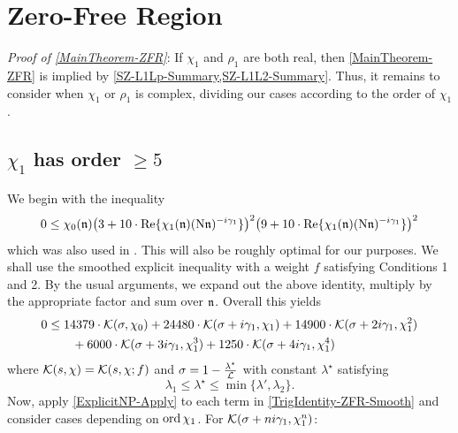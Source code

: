 \documentclass[12pt,psamsfonts]{amsart}
\DeclareRobustCommand{\SkipTocEntry}[5]{}
\theoremstyle{definition}
\theoremstyle{remark}
\numberwithin{equation}{section}
\begin{document}
\section{Zero-Free Region}
\label{sec:ZeroFreeRegion}
\noindent
\emph{Proof of \cref{MainTheorem-ZFR}}:   If $\chi_1$ and $\rho_1$ are both real, then \cref{MainTheorem-ZFR} is implied by \cref{SZ-L1Lp-Summary,SZ-L1L2-Summary}. 
Thus, it remains to consider when $\chi_1$ or $\rho_1$ is complex, dividing our cases according to the order of $\chi_1$.
\noindent
{}
\subsection*{$\chi_1$ has order $\geq 5$}
We begin with the inequality 
\begin{equation}
0  \leq \chi_0(\mathfrak{n}) \big(3+10 \cdot\mathrm{Re}\{ \chi_1(\mathfrak{n}) (\mathrm{N}\mathfrak{n})^{-i\gamma_1}\} \big)^2 \big( 9 + 10 \cdot \mathrm{Re}\{\chi_1(\mathfrak{n}) (\mathrm{N}\mathfrak{n})^{-i\gamma_1} \} \big)^2
\label{ZFR-TrigIdentity-NonPrincipal}
\end{equation}
which was also used in \cite[Section 9]{HBLinnik}. This will also be roughly optimal for our purposes. We shall use the smoothed explicit inequality with a weight $f$ satisfying Conditions 1 and 2. By the usual arguments, we expand out the above identity, multiply by the appropriate factor and sum over $\mathfrak{n}$. Overall this yields
\begin{equation}
\begin{aligned}
0 & \leq 14379 \cdot \mathcal{K}(\sigma, \chi_0)  +  24480  \cdot \mathcal{K}(\sigma+i\gamma_1, \chi_1) +  14900 \cdot \mathcal{K}(\sigma+2i\gamma_1, \chi_1^2) \\
& \qquad +  6000 \cdot \mathcal{K}(\sigma + 3i\gamma_1, \chi_1^3) + 1250 \cdot \mathcal{K}(\sigma + 4i\gamma_1, \chi_1^4) \\
\end{aligned} 
\label{TrigIdentity-ZFR-Smooth}
\end{equation}
where $\mathcal{K}(s,\chi) = \mathcal{K}(s,\chi; f)$ and $\sigma = 1-\frac{\lambda^{\star}}{\mathcal{L}}$ with constant $\lambda^{\star}$ satisfying
\[
\lambda_1 \leq \lambda^{\star} \leq \min\{ \lambda', \lambda_2\}. 
\]
Now, apply \cref{ExplicitNP-Apply} to each term in \eqref{TrigIdentity-ZFR-Smooth} and consider cases depending on $\mathrm{ord}\, \chi_1$. For $\mathcal{K}(\sigma+ni\gamma_1,\chi_1^n)$:
\end{document}
